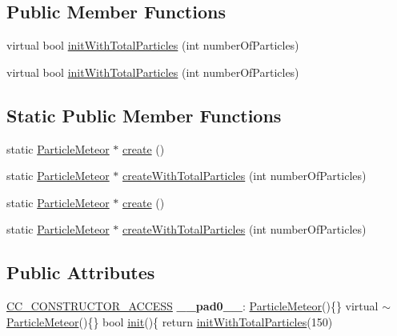 \subsection*{Public Member Functions}
\begin{DoxyCompactItemize}
\item 
virtual bool \hyperlink{classParticleMeteor_afdcabc1ed84b2161135a2854850a0143}{init\+With\+Total\+Particles} (int number\+Of\+Particles)
\item 
virtual bool \hyperlink{classParticleMeteor_a4150cf7ece1830194a02a9ab45abde41}{init\+With\+Total\+Particles} (int number\+Of\+Particles)
\end{DoxyCompactItemize}
\subsection*{Static Public Member Functions}
\begin{DoxyCompactItemize}
\item 
static \hyperlink{classParticleMeteor}{Particle\+Meteor} $\ast$ \hyperlink{classParticleMeteor_a57db98f9aa44361bb0dc75e7549885ac}{create} ()
\item 
static \hyperlink{classParticleMeteor}{Particle\+Meteor} $\ast$ \hyperlink{classParticleMeteor_a3b474d5d8027cb1c65de7f3b8c466b9b}{create\+With\+Total\+Particles} (int number\+Of\+Particles)
\item 
static \hyperlink{classParticleMeteor}{Particle\+Meteor} $\ast$ \hyperlink{classParticleMeteor_aa9d11d4fdb67f252edd256bccb576438}{create} ()
\item 
static \hyperlink{classParticleMeteor}{Particle\+Meteor} $\ast$ \hyperlink{classParticleMeteor_a3a597e14cddb1dd2977c6fbf3652684a}{create\+With\+Total\+Particles} (int number\+Of\+Particles)
\end{DoxyCompactItemize}
\subsection*{Public Attributes}
\begin{DoxyCompactItemize}
\item 
\mbox{\label{classParticleMeteor_a7967e155aada15413a5a1df3034b1b6e}} 
\hyperlink{_2cocos2d_2cocos_2base_2ccConfig_8h_a25ef1314f97c35a2ed3d029b0ead6da0}{C\+C\+\_\+\+C\+O\+N\+S\+T\+R\+U\+C\+T\+O\+R\+\_\+\+A\+C\+C\+E\+SS} {\bfseries \+\_\+\+\_\+pad0\+\_\+\+\_\+}\+: \hyperlink{classParticleMeteor}{Particle\+Meteor}()\{\} virtual $\sim$\hyperlink{classParticleMeteor}{Particle\+Meteor}()\{\} bool \hyperlink{classParticleSystem_a65c05b30432f6e8aeb45ba018f3a8d3f}{init}()\{ return \hyperlink{classParticleMeteor_afdcabc1ed84b2161135a2854850a0143}{init\+With\+Total\+Particles}(150)
\end{DoxyCompactItemize}
